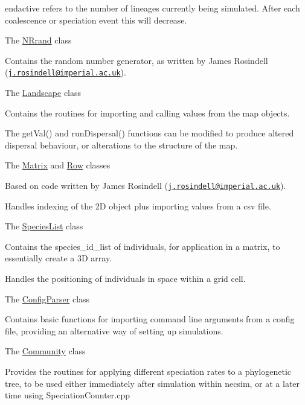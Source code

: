 \begin{DoxyItemize}
\begin{DoxyItemize}
\item {\ttfamily endactive} refers to the number of lineages currently being simulated. After each coalescence or speciation event this will decrease.
\end{DoxyItemize}
\item The {\ttfamily \hyperlink{class_n_rrand}{N\+Rrand}} class
\begin{DoxyItemize}
\item Contains the random number generator, as written by James Rosindell (\href{mailto:j.rosindell@imperial.ac.uk}{\tt j.\+rosindell@imperial.\+ac.\+uk}).
\end{DoxyItemize}
\item The {\ttfamily \hyperlink{class_landscape}{Landscape}} class
\begin{DoxyItemize}
\item Contains the routines for importing and calling values from the map objects.
\item The {\ttfamily get\+Val()} and {\ttfamily run\+Dispersal()} functions can be modified to produce altered dispersal behaviour, or alterations to the structure of the map.
\end{DoxyItemize}
\item The {\ttfamily \hyperlink{class_matrix}{Matrix}} and {\ttfamily \hyperlink{class_row}{Row}} classes
\begin{DoxyItemize}
\item Based on code written by James Rosindell (\href{mailto:j.rosindell@imperial.ac.uk}{\tt j.\+rosindell@imperial.\+ac.\+uk}).
\item Handles indexing of the 2D object plus importing values from a csv file.
\end{DoxyItemize}
\item The {\ttfamily \hyperlink{class_species_list}{Species\+List}} class
\begin{DoxyItemize}
\item Contains the species\+\_\+id\+\_\+list of individuals, for application in a matrix, to essentially create a 3D array.
\item Handles the positioning of individuals in space within a grid cell.
\end{DoxyItemize}
\item The {\ttfamily \hyperlink{class_config_parser}{Config\+Parser}} class
\begin{DoxyItemize}
\item Contains basic functions for importing command line arguments from a config file, providing an alternative way of setting up simulations.
\end{DoxyItemize}
\item The {\ttfamily \hyperlink{class_community}{Community}} class
\begin{DoxyItemize}
\item Provides the routines for applying different speciation rates to a phylogenetic tree, to be used either immediately after simulation within necsim, or at a later time using Speciation\+Counter.\+cpp
\end{DoxyItemize}
\end{DoxyItemize}

